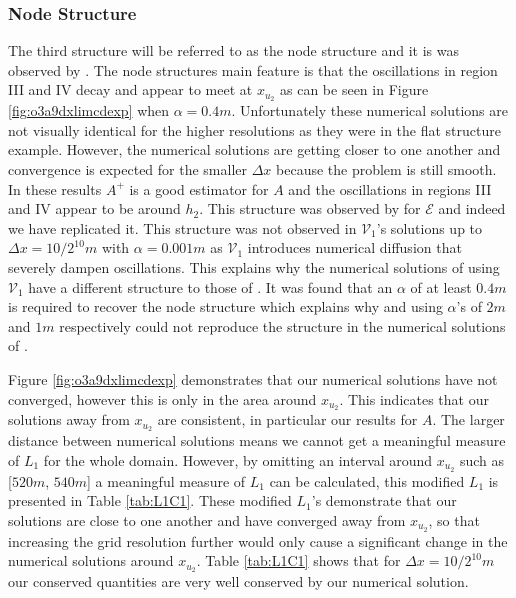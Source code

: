 \documentclass[times]{elsarticle}
\begin{document}
\subsubsection{Node Structure}
The third structure will be referred to as the node structure and it is was observed by \cite{El-etal-2006}. The node structures main feature is that the oscillations in region III and IV decay and appear to meet at $x_{u_2}$ as can be seen in Figure \ref{fig:o3a9dxlimcdexp} when $\alpha = 0.4m$. Unfortunately these numerical solutions are not visually identical for the higher resolutions as they were in the flat structure example. However, the numerical solutions are getting closer to one another and convergence is expected for the smaller $\Delta x$ because the problem is still smooth. In these results $A^+$ is a good estimator for $A$ and the oscillations in regions III and IV appear to be around $h_2$. This structure was observed by \cite{El-etal-2006} for $\mathcal{E}$ and indeed we have replicated it. This structure was not observed in $\mathcal{V}_1$'s solutions up to $\Delta x=10/2^{10}m$ with $\alpha=0.001m$ as $\mathcal{V}_1$ introduces numerical diffusion that severely dampen oscillations. This explains why the numerical solutions of \citet{Hank-etal-2010-2034} using $\mathcal{V}_1$ have a different structure to those of \citet{El-etal-2006}. It was found that an $\alpha$ of at least $0.4m$ is required to recover the node structure which explains why \citet{Mitsotakis-etal-2014} and \citet{Mitsotakis-etal-2017} using $\alpha$'s of $2m$ and $1m$ respectively could not reproduce the structure in the numerical solutions of \citet{El-etal-2006}. 

Figure \ref{fig:o3a9dxlimcdexp} demonstrates that our numerical solutions have not converged, however this is only in the area around $x_{u_2}$. This indicates that our solutions away from $x_{u_2}$ are consistent, in particular our results for $A$. The larger distance between numerical solutions means we cannot get a meaningful measure of $L_1$ for the whole domain. However, by omitting an interval around $x_{u_2}$ such as [$520m$, $540m$] a meaningful measure of $L_1$ can be calculated, this modified $L_1$ is presented in Table \ref{tab:L1C1}. These modified $L_1$'s demonstrate that our solutions are close to one another and have converged away from $x_{u_2}$, so that increasing the grid resolution further would only cause a significant change in the numerical solutions around $x_{u_2}$. Table \ref{tab:L1C1} shows that for $\Delta x = 10/2^{10}m$ our conserved quantities are very well conserved by our numerical solution.
\end{document}
